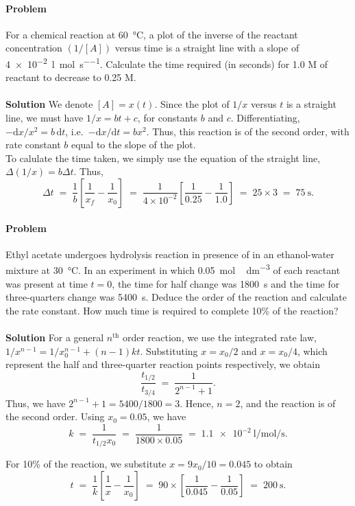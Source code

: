 \documentclass[10pt]{article}
\newcounter{prob}
\def\problem{\stepcounter{prob}\paragraph{Problem \arabic{prob}}}
\def\solution{\\\\\textbf{Solution }}
\begin{document}
        \problem For a chemical reaction at \SI{60}{\celsius}, a plot of the inverse of the reactant concentration $(1 / [A])$ versus time 
        is a straight line with a slope of \SI{4e-2}{\litre\per\mole\per\s}. Calculate the time required (in seconds) for 1.0 M of reactant
        to decrease to 0.25 M.
        \solution We denote $[A] = x(t)$. Since the plot of $1 /x$ versus $t$ is a straight line, we must have $1 /x = bt + c$, for constants
        $b$ and $c$. Differentiating, $-\mathrm{d}{x}/ x^2 = b\,\mathrm{d}{t}$, i.e.\ $-{\mathrm{d} x}/{\mathrm{d}t} = bx^2$.
        Thus, this reaction is of the second order, with rate constant $b$ equal to the slope of the plot. \\
        To calulate the time taken, we simply use the equation of the straight line, $\Delta{(1 /x)}= b\Delta{t}  $. Thus,
        \[
        \Delta{t} \;=\; \frac{1}{b} \left[ \frac{1}{x_f} - \frac{1}{x_0} \right]
                \;=\; \frac{1}{4\times10^{-2}} \left[ \frac{1}{0.25} - \frac{1}{1.0} \right] 
                \;=\; 25 \times 3 \;=\; \SI{75}{\s}.
        \]

        \problem Ethyl acetate undergoes hydrolysis reaction in presence of  in an ethanol-water mixture at \SI{30}{\celsius}.
        In an experiment in which \SI{0.05}{\mole\, \dm^{-3}} of each reactant was present at time $t = 0$, the time for half change was
        \SI{1800}{\s} and the time for three-quarters change was \SI{5400}{\s}. Deduce the order of the reaction and calculate the rate constant.
        How much time is required to complete 10\% of the reaction?
        \solution
        For a general $n^\text{th}$ order reaction, we use the integrated rate law, $1 /x^{n-1} = 1 /x_0^{n-1} + (n-1)kt$.
        Substituting $x = x_0 /2$ and $x = x_0 /4$, which represent the half and three-quarter reaction points respectively, we obtain
        \[
        \frac{t_{1 /2}}{t_{3 /4}} \;=\; \frac{1}{2^{n-1} + 1}.
        \]
        Thus, we have $2^{n-1} + 1 = 5400 /1800 = 3$. Hence, $n = 2$, and the reaction is of the second order. Using $x_0 = 0.05$, we have
        \[
        k \;=\; \frac{1}{t_{1 /2} x_0} \;=\; \frac{1}{1800 \times 0.05} \;=\; \SI{1.1e-2}{\litre\per\mole\per\s}.
        \]

        For 10\% of the reaction, we substitute $x = 9x_0 / 10 = 0.045$ to obtain
        \[
        t \;=\; \frac{1}{k} \left[ \frac{1}{x} - \frac{1}{x_0} \right] \;=\; 90\times \left[ \frac{1}{0.045} - \frac{1}{0.05} \right]
                \;=\; \SI{200}{\s}.
        \]
\end{document}
